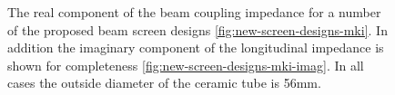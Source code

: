 \begin{figure}
\begin{center}
\end{center}
\caption{The real component of the beam coupling impedance for a number of the proposed beam screen designs \ref{fig:new-screen-designs-mki}. In addition the imaginary component of the longitudinal impedance is shown for completeness \ref{fig:new-screen-designs-mki-imag}. In all cases the outside diameter of the ceramic tube is 56mm.}
\end{figure}

